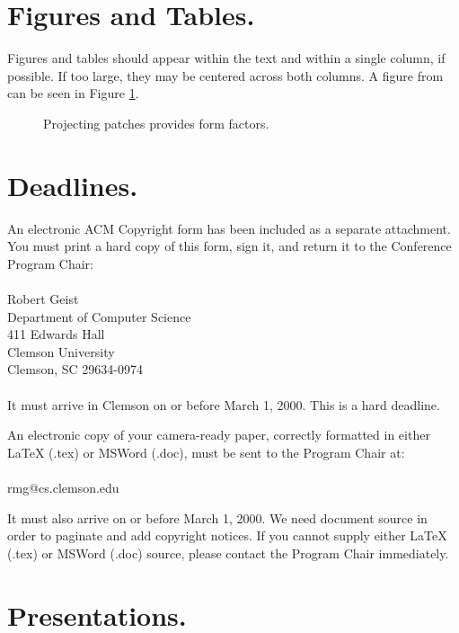 \documentclass[twocolumn]{article}
\begin{document}
\section{Figures and Tables.}

Figures and tables should appear within the text and within a single column, 
if possible.  If too large, they may be centered across both columns.  A
figure from \cite{danforth} can be seen in Figure 
\ref{fig:hemisphere_proj}.

\begin{figure}
\centerline{}
\caption{\label{fig:hemisphere_proj}Projecting patches provides form factors.}
\end{figure}

\section{Deadlines.}

An electronic ACM Copyright form has been included as a separate attachment.  
You must print a hard copy of this form, sign it, and return it to the 
Conference Program Chair:\\
\quad\\
Robert Geist \\
Department of Computer Science \\
411 Edwards Hall \\
Clemson University \\
Clemson, SC 29634-0974\\
\quad\\
It must arrive in Clemson on or before March 1, 2000.  This is a
hard deadline.

An electronic copy of your camera-ready paper, correctly formatted in 
either LaTeX (.tex) or MSWord (.doc), must be sent to the Program Chair at:\\
\quad\\
rmg@cs.clemson.edu

It must also arrive on or before March 1, 2000.
We need document source in order to paginate and add copyright notices.
If you cannot supply either LaTeX (.tex) or MSWord (.doc) source, please
contact the Program Chair immediately.

\section{Presentations.}
\end{document}
